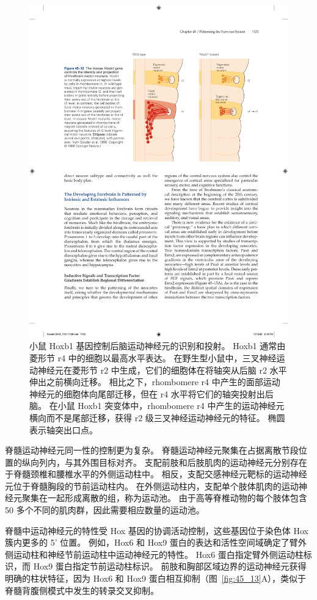 \begin{figure}[htbp]
	\centering
	\includegraphics[width=0.75\linewidth]{chap45/fig_45_12}
	\caption{小鼠 Hoxb1 基因控制后脑运动神经元的识别和投射。
		Hoxb1 通常由菱形节 r4 中的细胞以最高水平表达。
		在野生型小鼠中，三叉神经运动神经元在菱形节 r2 中生成，它们的细胞体在将轴突从后脑 r2 水平伸出之前横向迁移。
		相比之下，rhombomere r4 中产生的面部运动神经元的细胞体向尾部迁移，但在 r4 水平将它们的轴突投射出后脑。
		在小鼠 Hoxb1 突变体中，rhombomere r4 中产生的运动神经元横向而不是尾部迁移，获得 r2 级三叉神经运动神经元的特征。
		椭圆表示轴突出口点\cite{studer1996altered}。}
	\label{fig:45_12}
\end{figure}


脊髓运动神经元同一性的控制更为复杂。
脊髓运动神经元聚集在占据离散节段位置的纵向列内，与其外围目标对齐。
支配前肢和后肢肌肉的运动神经元分别存在于脊髓颈椎和腰椎水平的外侧运动柱中。
相反，支配交感神经元靶标的运动神经元位于脊髓胸段的节前运动柱内。
在外侧运动柱内，支配单个肢体肌肉的运动神经元聚集在一起形成离散的组，称为运动池。
由于高等脊椎动物的每个肢体包含 50 多个不同的肌肉群，因此需要相应数量的运动池。


脊髓中运动神经元的特性受 Hox 基因的协调活动控制，这些基因位于染色体 Hox 簇内更多的 5' 位置。
例如，Hox6 和 Hox9 蛋白的表达和活性空间域确定了臂外侧运动柱和神经节前运动柱中运动神经元的特性。
Hox6 蛋白指定臂外侧运动柱标识，而 Hox9 蛋白指定节前运动柱标识。
前肢和胸部区域边界的运动神经元获得明确的柱状特征，因为 Hox6 和 Hox9 蛋白相互抑制（图~\ref{fig:45_13}A），类似于脊髓背腹侧模式中发生的转录交叉抑制。


